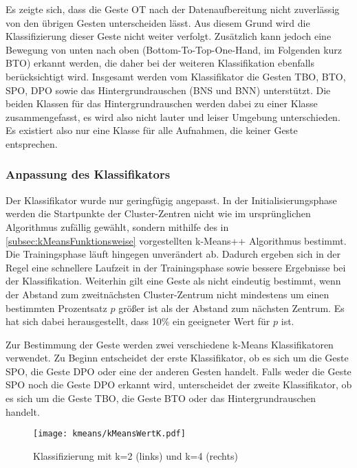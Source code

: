 Es zeigte sich, dass die Geste \ac{OT} nach der Datenaufbereitung nicht zuverlässig von den übrigen Gesten unterscheiden lässt. Aus diesem Grund wird die Klassifizierung dieser Geste nicht weiter verfolgt. Zusätzlich kann jedoch eine Bewegung von unten nach oben (Bottom-To-Top-One-Hand, im Folgenden kurz BTO) erkannt werden, die daher bei der weiteren Klassifikation ebenfalls berücksichtigt wird. Insgesamt werden vom Klassifikator die Gesten \ac{TBO}, BTO, \ac{SPO}, \ac{DPO} sowie das Hintergrundrauschen (\ac{BNS} und \ac{BNN}) unterstützt. Die beiden Klassen für das Hintergrundrauschen werden dabei zu einer Klasse zusammengefasst, es wird also nicht lauter und leiser Umgebung unterschieden. Es existiert also nur eine Klasse für alle Aufnahmen, die keiner Geste entsprechen.

\subsubsection{Anpassung des Klassifikators}
Der Klassifikator wurde nur geringfügig angepasst.
In der Initialisierungsphase werden die Startpunkte der Cluster-Zentren nicht wie im ursprünglichen Algorithmus zufällig gewählt, sondern mithilfe des in \autoref{subsec:kMeansFunktionsweise} vorgestellten k-Means++ Algorithmus bestimmt. Die Trainingsphase läuft hingegen unverändert ab.
Dadurch ergeben sich in der Regel eine schnellere Laufzeit in der Trainingsphase sowie bessere Ergebnisse bei der Klassifikation.
Weiterhin gilt eine Geste als nicht eindeutig bestimmt, wenn der Abstand zum zweitnächsten Cluster-Zentrum nicht mindestens um einen bestimmten Prozentsatz $p$ größer ist als der Abstand zum nächsten Zentrum. Es hat sich dabei herausgestellt, dass 10\% ein geeigneter Wert für $p$ ist.

Zur Bestimmung der Geste werden zwei verschiedene k-Means Klassifikatoren verwendet. Zu Beginn entscheidet der erste Klassifikator, ob es sich um die Geste \ac{SPO}, die Geste \ac{DPO} oder eine der anderen Gesten handelt.
Falls weder die Geste \ac{SPO} noch die Geste \ac{DPO} erkannt wird, unterscheidet der zweite Klassifikator, ob es sich um die Geste \ac{TBO}, die Geste BTO oder das Hintergrundrauschen handelt. 



\begin{figure*}[htbp]
    \centering
   \texttt{[image: kmeans/kMeansWertK.pdf]}
\caption{Klassifizierung mit k=2 (links) und k=4 (rechts)}
\label{fig:kMeansWertK}
\end{figure*}

